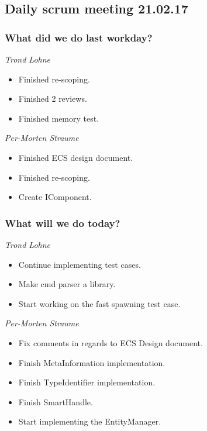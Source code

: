 \documentclass{article}
\begin{document}
\begin{center}
\subsection*{Daily scrum meeting 21.02.17}
\end{center}
\bigskip


\subsubsection*{What did we do last workday?}

\noindent\textit{Trond Lohne}
\begin{itemize}
	\item 
	Finished re-scoping.
	
	\item 
	Finished 2 reviews.
	
	\item 
	Finished memory test.
\end{itemize}

\medskip

\noindent\textit{Per-Morten Straume}
\begin{itemize}
	\item 
    Finished ECS design document.
	
	\item 
	Finished re-scoping.
	
	\item 
	Create IComponent.
\end{itemize}


\subsubsection*{What will we do today?}

\noindent\textit{Trond Lohne}
\begin{itemize}
	\item 
	Continue implementing test cases.
	
	\item 
	Make cmd parser a library.
	
	\item 
	Start working on the fast spawning test case.
\end{itemize}

\medskip

\noindent\textit{Per-Morten Straume}
\begin{itemize}
	\item 
	Fix comments in regards to ECS Design document.
	
	\item 
	Finish MetaInformation implementation.
	
	\item 
	Finish TypeIdentifier implementation.

    \item
    Finish SmartHandle.

    \item
    Start implementing the EntityManager.
\end{itemize}
\end{document}
